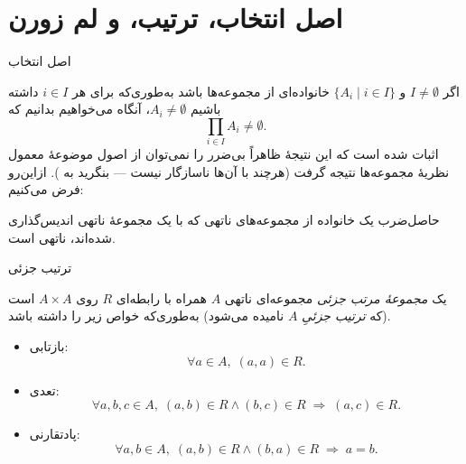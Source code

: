 \section{اصل انتخاب، ترتیب، و لم زورن}

\begin{frame}[t]{اصل انتخاب}

    اگر $I \ne \emptyset$ و $\{A_i \mid i \in I\}$ خانواده‌ای از مجموعه‌ها باشد به‌طوری‌که برای هر $i \in I$ داشته باشیم $A_i \ne \emptyset$، آنگاه می‌خواهیم بدانیم که
    \[
        \prod_{i \in I} A_i \ne \emptyset.
    \]
    اثبات شده است که این نتیجهٔ ظاهراً بی‌ضرر را نمی‌توان از اصول موضوعهٔ معمول نظریهٔ مجموعه‌ها نتیجه گرفت (هرچند با آن‌ها ناسازگار نیست — بنگرید به ). ازاین‌رو فرض می‌کنیم:


    \begin{definition}
        حاصل‌ضرب یک خانواده از مجموعه‌های ناتهی که با یک مجموعهٔ ناتهی اندیس‌گذاری شده‌اند، ناتهی است.
    \end{definition}

\end{frame}

\begin{frame}[t]{ترتیب جزئی}

    \begin{definition}
        یک \textit{مجموعهٔ مرتب جزئی} مجموعه‌ای ناتهی $A$ همراه با رابطه‌ای $R$ روی $A \times A$ است (که \textit{ترتیب جزئیِ} $A$ نامیده می‌شود) به‌طوری‌که خواص زیر
        را داشته باشد.


        \begin{itemize}
            \item بازتابی:
                  \[
                      \forall a \in A,\; (a,a) \in R.
                  \]
            \item تعدی:
                  \[
                      \forall a,b,c \in A,\; (a,b) \in R \land (b,c) \in R \;\Rightarrow\; (a,c) \in R.
                  \]
            \item پادتقارنی:
                  \[
                      \forall a,b \in A,\; (a,b) \in R \land (b,a) \in R \;\Rightarrow\; a = b.
                  \]
        \end{itemize}



    \end{definition}






\end{frame}

